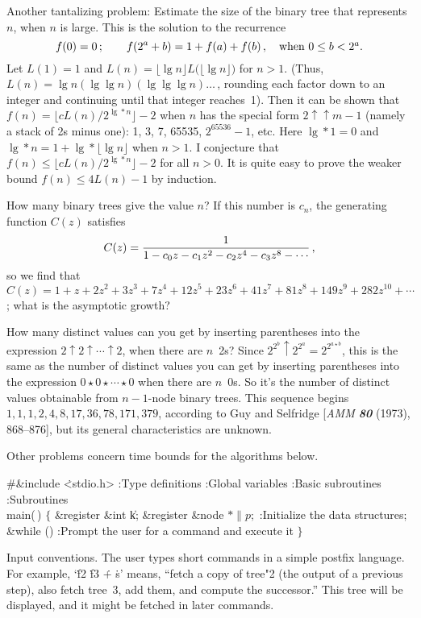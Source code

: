 Another tantalizing problem: Estimate the size of the binary tree that
represents $n$, when $n$ is large. This is the solution to the recurrence
$$f(0)=0\,;\qquad f(2^a+b)=1+f(a)+f(b)\,,\quad\hbox{when $0\le b<2^a$}.$$
Let $L(1)=1$ and $L(n)=\lfloor\lg n\rfloor L\bigl(\lfloor\lg n\rfloor\bigr)$
for $n>1$. (Thus, $L(n)=\lg n(\lg\lg n)(\lg\lg\lg n)\ldots\,$, rounding
each factor down to an integer and continuing until that integer reaches~1).
Then it can be shown that $f(n)=\lfloor cL(n)/2^{\lg*n}\rfloor-2$ when
$n$ has the special form $2\uparrow\uparrow m-1$ (namely a stack of 2s
minus one): 1, 3, 7, 65535, $2^{65536}-1$, etc. Here $\lg*1=0$ and
$\lg*n=1+\lg*\lfloor\lg n\rfloor$ when $n>1$. I conjecture that
$f(n)\le\lfloor cL(n)/2^{\lg*n}\rfloor-2$ for all $n>0$. It is quite easy
to prove the weaker bound $f(n)\le4L(n)-1$ by induction.

How many binary trees give the value $n$? If this number is $c_n$, the
generating function $C(z)$ satisfies
$$C(z)={1\over1-c_0z-c_1z^2-c_2z^4-c_3z^8-\cdots}\,,$$
so we find that $C(z)=1+z+2z^2+3z^3+7z^4+12z^5+23z^6+41z^7+81z^8+149z^9
+282z^{10}+\cdots\,$; what is the asymptotic growth?

How many distinct values can you get by inserting parentheses into
the expression $2\uparrow2\uparrow\cdots\uparrow2$, when there are $n$~2s?
Since $2^{2^b}\uparrow2^{2^a}=2^{2^{a\star b}}$, this is the same as the
number of distinct values you can get by inserting parentheses into
the expression $0\star0\star\cdots\star0$ when there are $n$~0s. So it's
the number of distinct values obtainable from $n-1$-node binary trees.
This sequence begins $1,1,1,2,4,8,17,36,78,171,379$, according to
Guy and Selfridge [{\sl AMM\/ \bf80} (1973), 868--876], but its general
characteristics are unknown.

Other problems concern time bounds for the algorithms below.

\Y\B\8\#\&{include} \.{<stdio.h>}\7
:Type definitions\X\6
:Global variables\X\6
:Basic subroutines\X\6
:Subroutines\X\7
\\{main}(\,)\1\1\2\2\6
${}\{{}$\1\6
\&{register} \&{int} \|k;\6
\&{register} \&{node} ${}{*}\|p;{}$\7
:Initialize the data structures\X;\6
\&{while} ()\1\5
:Prompt the user for a command and execute it\X\2\6
\4${}\}{}$\2\par
\fi

Input conventions. The user types short commands in a
simple postfix
language. For example, `\.{f2} \.{f3} \.+ \.s' means, ``fetch a copy of
tree"2 (the output of a previous step), also fetch tree~3,
add them, and compute the successor.''
This tree will be displayed, and it might be fetched in later commands.

